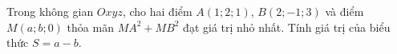 \begin{ex}
Trong không gian $Oxyz$, cho hai điểm $A(1;2;1)$, $B(2;-1;3)$ và điểm $M(a;b;0)$ thỏa mãn $MA^2+MB^2$ đạt giá trị nhỏ nhất. Tính giá trị của biểu thức $S=a-b$.
\end{ex}
